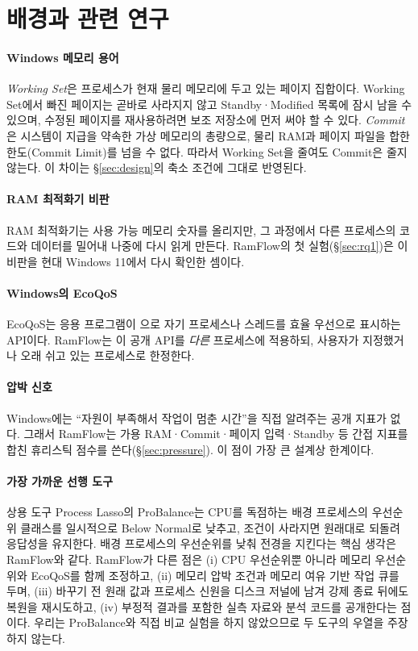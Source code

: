 \documentclass[11pt]{article}
\begin{document}
\section{배경과 관련 연구}
\label{sec:background}

\paragraph{Windows 메모리 용어}
\emph{Working Set}은 프로세스가 현재 물리 메모리에 두고 있는 페이지 집합이다\citep{mswset}. Working Set에서 빠진 페이지는 곧바로 사라지지 않고 Standby·Modified 목록에 잠시 남을 수 있으며, 수정된 페이지를 재사용하려면 보조 저장소에 먼저 써야 할 수 있다\citep{mswset}. \emph{Commit}은 시스템이 지급을 약속한 가상 메모리의 총량으로, 물리 RAM과 페이지 파일을 합한 한도(Commit Limit)를 넘을 수 없다. 따라서 Working Set을 줄여도 Commit은 줄지 않는다. 이 차이는 \S\ref{sec:design}의 축소 조건에 그대로 반영된다.

\paragraph{RAM 최적화기 비판}
RAM 최적화기는 사용 가능 메모리 숫자를 올리지만, 그 과정에서 다른 프로세스의 코드와 데이터를 밀어내 나중에 다시 읽게 만든다\citep{russinovich2004}. RamFlow의 첫 실험(\S\ref{sec:rq1})은 이 비판을 현대 Windows 11에서 다시 확인한 셈이다.

\paragraph{Windows의 EcoQoS}
EcoQoS는 응용 프로그램이 으로 자기 프로세스나 스레드를 효율 우선으로 표시하는 API이다\citep{ecoqos2021,mssetprocinfo}. RamFlow는 이 공개 API를 \emph{다른} 프로세스에 적용하되, 사용자가 지정했거나 오래 쉬고 있는 프로세스로 한정한다.

\paragraph{압박 신호}
Windows에는 ``자원이 부족해서 작업이 멈춘 시간''을 직접 알려주는 공개 지표가 없다. 그래서 RamFlow는 가용 RAM·Commit·페이지 입력·Standby 등 간접 지표를 합친 휴리스틱 점수를 쓴다(\S\ref{sec:pressure}). 이 점이 가장 큰 설계상 한계이다.

\paragraph{가장 가까운 선행 도구}
상용 도구 Process Lasso의 ProBalance는 CPU를 독점하는 배경 프로세스의 우선순위 클래스를 일시적으로 Below Normal로 낮추고, 조건이 사라지면 원래대로 되돌려 응답성을 유지한다\citep{probalance}. 배경 프로세스의 우선순위를 낮춰 전경을 지킨다는 핵심 생각은 RamFlow와 같다. RamFlow가 다른 점은 (i) CPU 우선순위뿐 아니라 메모리 우선순위와 EcoQoS를 함께 조정하고, (ii) 메모리 압박 조건과 메모리 여유 기반 작업 큐를 두며, (iii) 바꾸기 전 원래 값과 프로세스 신원을 디스크 저널에 남겨 강제 종료 뒤에도 복원을 재시도하고, (iv) 부정적 결과를 포함한 실측 자료와 분석 코드를 공개한다는 점이다. 우리는 ProBalance와 직접 비교 실험을 하지 않았으므로 두 도구의 우열을 주장하지 않는다.
\end{document}
